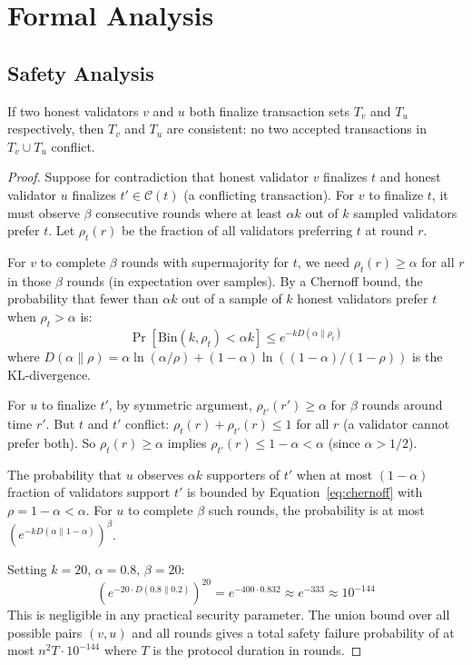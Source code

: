 \section{Formal Analysis}

\label{sec:analysis}

\subsection{Safety Analysis}

\begin{theorem}[Safety]
\label{thm:safety}
If two honest validators $v$ and $u$ both finalize transaction sets $T_v$ and $T_u$
respectively, then $T_v$ and $T_u$ are consistent: no two accepted transactions in
$T_v \cup T_u$ conflict.
\end{theorem}

\begin{proof}
Suppose for contradiction that honest validator $v$ finalizes $t$ and honest validator $u$
finalizes $t' \in \mathcal{C}(t)$ (a conflicting transaction). For $v$ to finalize $t$,
it must observe $\beta$ consecutive rounds where at least $\alpha k$ out of $k$ sampled
validators prefer $t$. Let $\rho_t(r)$ be the fraction of all validators preferring $t$
at round $r$.

For $v$ to complete $\beta$ rounds with supermajority for $t$, we need $\rho_t(r) \geq \alpha$
for all $r$ in those $\beta$ rounds (in expectation over samples). By a Chernoff bound,
the probability that fewer than $\alpha k$ out of a sample of $k$ honest validators
prefer $t$ when $\rho_t > \alpha$ is:
\begin{equation}
\Pr[\text{Bin}(k, \rho_t) < \alpha k] \leq e^{-k D(\alpha \| \rho_t)}
\label{eq:chernoff}
\end{equation}
where $D(\alpha \| \rho) = \alpha \ln(\alpha/\rho) + (1-\alpha)\ln((1-\alpha)/(1-\rho))$
is the KL-divergence.

For $u$ to finalize $t'$, by symmetric argument, $\rho_{t'}(r') \geq \alpha$ for $\beta$
rounds around time $r'$. But $t$ and $t'$ conflict: $\rho_t(r) + \rho_{t'}(r) \leq 1$
for all $r$ (a validator cannot prefer both). So $\rho_t(r) \geq \alpha$ implies
$\rho_{t'}(r) \leq 1 - \alpha < \alpha$ (since $\alpha > 1/2$).

The probability that $u$ observes $\alpha k$ supporters of $t'$ when at most $(1-\alpha)$
fraction of validators support $t'$ is bounded by Equation~\ref{eq:chernoff} with
$\rho = 1 - \alpha < \alpha$. For $u$ to complete $\beta$ such rounds, the probability
is at most $(e^{-k D(\alpha \| 1-\alpha)})^\beta$.

Setting $k = 20$, $\alpha = 0.8$, $\beta = 20$:
\begin{equation}
(e^{-20 \cdot D(0.8 \| 0.2)})^{20} = e^{-400 \cdot 0.832} \approx e^{-333} \approx 10^{-144}
\end{equation}
This is negligible in any practical security parameter. The union bound over all possible
pairs $(v, u)$ and all rounds gives a total safety failure probability of at most
$n^2 T \cdot 10^{-144}$ where $T$ is the protocol duration in rounds.
\end{proof}

